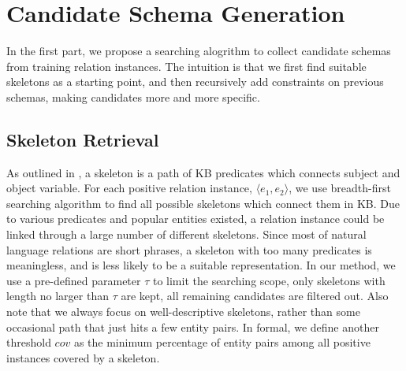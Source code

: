 \section{Candidate Schema Generation}
\label{sec:candgen}

In the first part, we propose a searching alogrithm to collect 
candidate schemas from training relation instances.
The intuition is that we first find suitable skeletons 
as a starting point, and then recursively add constraints on 
previous schemas, making candidates more and more specific.

\subsection{Skeleton Retrieval}
As outlined in , a skeleton is a path of KB 
predicates which connects subject and object variable.
For each positive relation instance, $\langle e_1, e_2 \rangle$, 
we use breadth-first searching algorithm to find all possible 
skeletons which connect them in KB.
Due to various predicates and popular entities existed, a relation 
instance could be linked through a large number of different skeletons.
Since most of natural language relations are short phrases, a 
skeleton with too many predicates is meaningless, and is less likely 
to be a suitable representation.
In our method, we use a pre-defined parameter $\tau$ to limit the 
searching scope, only skeletons with length no larger than $\tau$ 
are kept, all remaining candidates are filtered out.
Also note that we always focus on well-descriptive skeletons, 
rather than some occasional path that just hits a few entity pairs.
In formal, we define another threshold $cov$ as the minimum 
percentage of entity pairs among all positive instances covered 
by a skeleton.

